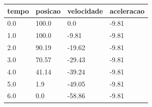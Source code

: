 \begin{tabular}{llll}
\toprule
tempo & posicao & velocidade & aceleracao \\
\midrule
0.0 & 100.0 & 0.0 & -9.81 \\
1.0 & 100.0 & -9.81 & -9.81 \\
2.0 & 90.19 & -19.62 & -9.81 \\
3.0 & 70.57 & -29.43 & -9.81 \\
4.0 & 41.14 & -39.24 & -9.81 \\
5.0 & 1.9 & -49.05 & -9.81 \\
6.0 & 0.0 & -58.86 & -9.81 \\
\bottomrule
\end{tabular}
